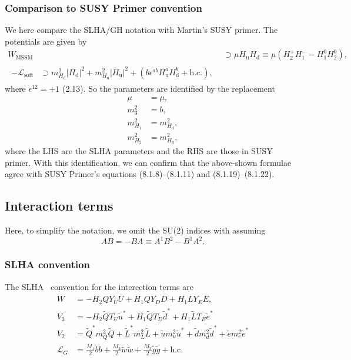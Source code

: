 \documentclass[a4paper,11pt,captions=tableheading,DIV=12]{scrartcl}
\newcommand\w[1]{_{\mathrm{#1}}}
\newcommand{\bU}{\bar U}
\newcommand{\bD}{\bar D}
\newcommand{\bE}{\bar E}
\begin{document}
\subsubsection{Comparison to SUSY Primer convention}
We here compare the SLHA/GH notation with Martin's SUSY primer.
The potentials are given by
\begin{align}
 W\w{MSSM}
&\supset
 \mu H\w u H\w d 
\equiv
\mu (H_2^+H_1^- - H_1^0H_2^0),\tag{SP:6.1.1--3}\\
%
\begin{split}
-\mathcal L\w{soft}&\supset
  m_{H\w d}^{2}|H\w d|^2
 + m_{H\w u}^{2}|H\w u|^2
 + (b\epsilon^{ab}H\w u^aH\w d^b +\text{h.c.}),
\end{split}\tag{SP:6.3.1}
%
\end{align}
where $\epsilon^{12}=+1$ (2.13).
So the parameters are identified by the replacement
\begin{align}
\mu&=\mu,\\
m_3^2&=b,
\\
m_{H_1}^2 &= m_{H\w d}^2,
\\
m_{H_2}^2 &= m_{H\w u}^2,
\end{align}
where the LHS are the SLHA parameters and the RHS are those in SUSY primer.
With this identification, we can confirm that the above-shown formulae agree with SUSY Primer's equations (8.1.8)--(8.1.11) and (8.1.19)--(8.1.22).



\subsection{Interaction terms}
Here, to simplify the notation, we omit the SU(2) indices with assuming
\begin{equation*}
 AB=-BA\equiv A^1B^2-B^1A^2.
\end{equation*}
\subsubsection{SLHA convention}
The SLHA~\cite{SLHA} convention for the interection terms are
\begin{align}
 W &=
 - H_2 QY_U\bU
 + H_1 QY_D\bD
 + H_1 LY_E\bE,
\tag{SLHA:3}\\
 V_3 &=
 - H_2 \tilde Q T_U \tilde u^*
 + H_1 \tilde Q T_D \tilde d^*
 + H_1 \tilde L T_E \tilde e^*
\tag{SLHA:5}\\
 V_2 &=
  \tilde Q^*m_{Q}^{2} \tilde Q
 + \tilde L^*m_{L}^{2} \tilde L
 + \tilde u  m_{u}^{2} \tilde u^*
 + \tilde d  m_{d}^{2} \tilde d^*
 + \tilde e  m_{e}^{2} \tilde e^*
\tag{SLHA:7}\\
 \mathcal L_G &= \frac{M_1}{2}\tilde b\tilde b+\frac{M_2}{2}\tilde w\tilde w+\frac{M_3}{2}\tilde g\tilde g + \text{h.c.}
\tag{SLHA:9}
\end{align}
\end{document}
